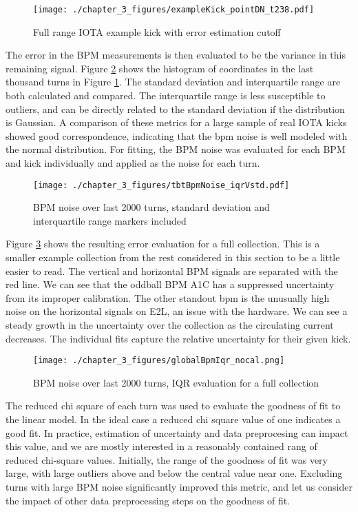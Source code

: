 \begin{figure}
    \centering
    \texttt{[image: ./chapter\_3\_figures/exampleKick\_pointDN\_t238.pdf]}
    \caption{Full range IOTA example kick with error estimation cutoff}
    \label{fig:bpmErrCutoff}
\end{figure}

The error in the BPM measurements is then evaluated to be the variance in this remaining signal. Figure \ref{fig:bpmErrIQR} shows the histogram of coordinates in the last thousand turns in Figure \ref{fig:bpmErrCutoff}. The standard deviation and interquartile range are both calculated and compared. The interquartile range is less susceptible to outliers, and can be directly related to the standard deviation if the distribution is Gaussian. A comparison of these metrics for a large sample of real IOTA kicks showed good correspondence, indicating that the bpm noise is well modeled with the normal distribution. For fitting, the BPM noise was evaluated for each BPM and kick individually and applied as the noise for each turn.

\begin{figure}
    \centering
    \texttt{[image: ./chapter\_3\_figures/tbtBpmNoise\_iqrVstd.pdf]}
    \caption{BPM noise over last 2000 turns, standard deviation and interquartile range markers included}
    \label{fig:bpmErrIQR}
\end{figure}

Figure \ref{fig:bpmErrSet} shows the resulting error evaluation for a full collection. This is a smaller example collection from the rest considered in this section to be a little easier to read. The vertical and horizontal BPM signals are separated with the red line. We can see that the oddball BPM A1C has a suppressed uncertainty from its improper calibration. The other standout bpm is the unusually high noise on the horizontal signals on E2L, an issue with the hardware. We can see a steady growth in the uncertainty over the collection as the circulating current decreases. The individual fits capture the relative uncertainty for their given kick.

\begin{figure}
    \centering
    \texttt{[image: ./chapter\_3\_figures/globalBpmIqr\_nocal.png]}
    \caption{BPM noise over last 2000 turns, IQR evaluation for a full collection}
    \label{fig:bpmErrSet}
\end{figure}

The reduced chi square of each turn was used to evaluate the goodness of fit to the linear model. In the ideal case a reduced chi square value of one indicates a good fit. In practice, estimation of uncertainty and data preprocesing can impact this value, and we are mostly interested in a reasonably contained rang of reduced chi-square values. Initially, the range of the goodness of fit was very large, with large outliers above and below the central value near one. Excluding turns with large BPM noise significantly improved this metric, and let us consider the impact of other data preprocessing steps on the goodness of fit.


